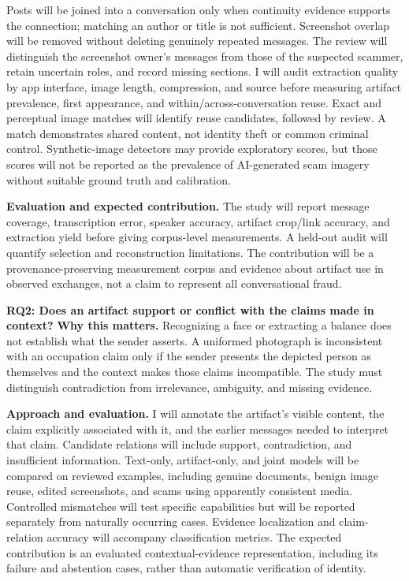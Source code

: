 \documentclass[letterpaper,11pt]{article}
\newcommand{\researchquestion}[1]{\par\medskip\noindent\textbf{#1}\quad}
\begin{document}
Posts will be joined into a conversation only when continuity evidence supports
the connection; matching an author or title is not sufficient. Screenshot overlap
will be removed without deleting genuinely repeated messages. The review will
distinguish the screenshot owner's messages from those of the suspected scammer,
retain uncertain roles, and record missing sections. I will audit extraction
quality by app interface, image length, compression, and source before measuring
artifact prevalence, first appearance, and within/across-conversation reuse.
Exact and perceptual image matches will identify reuse candidates, followed by
review. A match demonstrates shared content, not identity theft or common criminal
control. Synthetic-image detectors may provide exploratory scores, but those
scores will not be reported as the prevalence of AI-generated scam imagery
without suitable ground truth and calibration.

\textbf{Evaluation and expected contribution.} The study will report message
coverage, transcription error, speaker accuracy, artifact crop/link accuracy,
and extraction yield before giving corpus-level measurements. A held-out audit
will quantify selection and reconstruction limitations. The contribution will
be a provenance-preserving measurement corpus and evidence about artifact use
in observed exchanges, not a claim to represent all conversational fraud.

\researchquestion{RQ2: Does an artifact support or conflict with the claims made in context?}
\textbf{Why this matters.} Recognizing a face or extracting a balance does not
establish what the sender asserts. A uniformed photograph is inconsistent with
an occupation claim only if the sender presents the depicted person as themselves
and the context makes those claims incompatible. The study must distinguish
contradiction from irrelevance, ambiguity, and missing evidence.

\textbf{Approach and evaluation.} I will annotate the artifact's visible content,
the claim explicitly associated with it, and the earlier messages needed to
interpret that claim. Candidate relations will include support, contradiction,
and insufficient information. Text-only, artifact-only, and joint models will
be compared on reviewed examples, including genuine documents, benign image
reuse, edited screenshots, and scams using apparently consistent media.
Controlled mismatches will test specific capabilities but will be reported
separately from naturally occurring cases. Evidence localization and
claim-relation accuracy will accompany classification metrics. The expected
contribution is an evaluated contextual-evidence representation, including its
failure and abstention cases, rather than automatic verification of identity.
\end{document}
